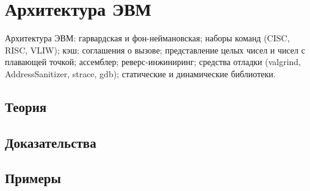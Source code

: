
\section{Архитектура ЭВМ}
\label{sec:2.3b.05-computer-architecture}

\begin{ticket}
Архитектура ЭВМ: гарвардская и фон-неймановская; наборы команд (CISC, RISC, VLIW); кэш; соглашения о вызове; представление целых чисел и чисел с плавающей точкой; ассемблер; реверс-инжиниринг; средства отладки (valgrind, AddressSanitizer, strace, gdb); статические и динамические библиотеки.
\end{ticket}

\subsection*{Теория}

\subsection*{Доказательства}

\subsection*{Примеры}
